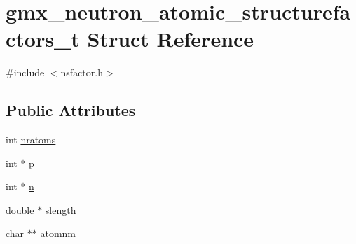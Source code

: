 \hypertarget{structgmx__neutron__atomic__structurefactors__t}{\section{gmx\-\_\-neutron\-\_\-atomic\-\_\-structurefactors\-\_\-t \-Struct \-Reference}
\label{structgmx__neutron__atomic__structurefactors__t}
}


{\ttfamily \#include $<$nsfactor.\-h$>$}

\subsection*{\-Public \-Attributes}
\begin{DoxyCompactItemize}
\item 
int \hyperlink{structgmx__neutron__atomic__structurefactors__t_ab08310bbda8081989e95afcaac754171}{nratoms}
\item 
int $\ast$ \hyperlink{structgmx__neutron__atomic__structurefactors__t_a90dd1abb0c67e2ceee90ea160cbbd302}{p}
\item 
int $\ast$ \hyperlink{structgmx__neutron__atomic__structurefactors__t_ad3f5ab2c2f4b8730bc85f2b44ae34d4b}{n}
\item 
double $\ast$ \hyperlink{structgmx__neutron__atomic__structurefactors__t_a42338605492094d62b1ed2c1028e8126}{slength}
\item 
char $\ast$$\ast$ \hyperlink{structgmx__neutron__atomic__structurefactors__t_ab64033d6c8f859a41d78d62545b2bd60}{atomnm}
\end{DoxyCompactItemize}


